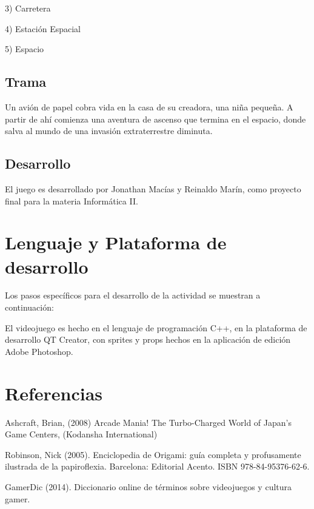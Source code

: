 \documentclass{article}
\begin{document}
3) Carretera

4) Estación Espacial

5) Espacio

\subsection{Trama}
Un avión de papel cobra vida en la casa de su creadora, una niña pequeña. A partir de ahí comienza una aventura de ascenso que termina en el espacio, donde salva al mundo de una invasión extraterrestre diminuta.
\subsection{Desarrollo}
El juego es desarrollado por Jonathan Macías y Reinaldo Marín, como proyecto final para la materia Informática II. 




\section{Lenguaje y Plataforma de desarrollo} \label{contenido}
Los pasos específicos para el desarrollo de la actividad se muestran a continuación:

El videojuego es hecho en el lenguaje de programación C++, en la plataforma de desarrollo QT Creator, con sprites y props hechos en la aplicación de edición Adobe Photoshop.

\section{Referencias} 
Ashcraft, Brian, (2008) Arcade Mania! The Turbo-Charged World of Japan's Game Centers, (Kodansha International)

Robinson, Nick (2005). Enciclopedia de Origami: guía completa y profusamente ilustrada de la papiroflexia. Barcelona: Editorial Acento. ISBN 978-84-95376-62-6.

GamerDic (2014). Diccionario online de términos sobre videojuegos y cultura gamer.
\end{document}
